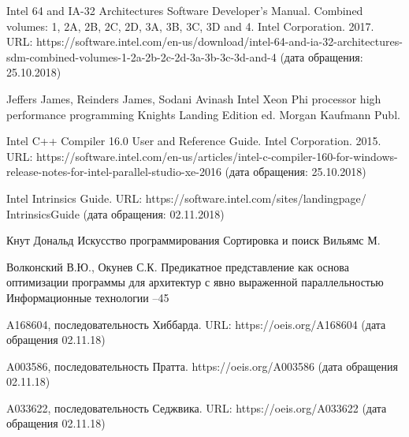 \documentclass[utf8]{psta}
\begin{document}
\begin{thebibliography}{30}

\by
Intel 64 and IA-32 Architectures Software Developer's Manual. Combined volumes: 1, 2A, 2B, 2C, 2D, 3A, 3B, 3C, 3D and 4. Intel Corporation. 2017. URL: https://software.intel.com/en-us/download/intel-64-and-ia-32-architectures-sdm-combined-volumes-1-2a-2b-2c-2d-3a-3b-3c-3d-and-4 (дата обращения: 25.10.2018)

\by Jeffers James, Reinders James, Sodani Avinash 
\book Intel Xeon Phi processor high performance programming
\bookinfo Knights Landing Edition
 ed.
\publ Morgan Kaufmann Publ.

\by
Intel C++ Compiler 16.0 User and Reference Guide. Intel Corporation. 2015. URL: https://software.intel.com/en-us/articles/intel-c-compiler-160-for-windows-release-notes-for-intel-parallel-studio-xe-2016 (дата обращения: 25.10.2018)

\by
Intel Intrinsics Guide. URL: https://software.intel.com/sites/landingpage/
IntrinsicsGuide (дата обращения: 02.11.2018)

\by Кнут Дональд
\book Искусство программирования
\voltitle Сортировка и поиск
\publ Вильямс
\publaddr М.

\by Волконский В.Ю., Окунев С.К.
\paper Предикатное представление как основа оптимизации программы для архитектур с явно выраженной параллельностью
\jour Информационные технологии
--45


\by
A168604, последовательность Хиббарда. URL: https://oeis.org/A168604 (дата обращения 02.11.18)

\by
A003586, последовательность Пратта. https://oeis.org/A003586 (дата обращения 02.11.18)

\by
A033622, последовательность Седжвика. URL: https://oeis.org/A033622 (дата обращения 02.11.18)

\end{thebibliography}
\end{document}
